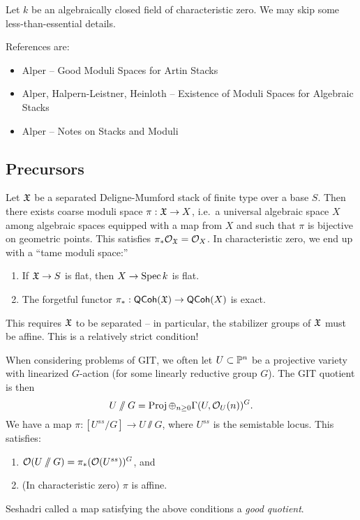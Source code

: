 \documentclass{amsart}
\begin{document}
Let $k$ be an algebraically closed field of characteristic zero.
We may skip some less-than-essential details.

References are:
\begin{itemize}
	\item Alper -- Good Moduli Spaces for Artin Stacks
	\item Alper, Halpern-Leistner, Heinloth -- Existence of Moduli Spaces for Algebraic Stacks
	\item Alper -- Notes on Stacks and Moduli
\end{itemize}

\subsection{Precursors}

\begin{thm}
	Let $\mathfrak{X}$ be a separated Deligne-Mumford stack of finite type over a base $S$.
	Then there exists coarse moduli space $\pi: \mathfrak{X} \to X$, i.e.\ a universal algebraic space $X$ among algebraic spaces equipped with a map from $X$ and such that $\pi$ is bijective on geometric points.
	This satisfies $\pi_* \mathcal{O}_{\mathfrak{X}} = \mathcal{O}_X$.
	In characteristic zero, we end up with a ``tame moduli space:''
	\begin{enumerate}
		\item If $\mathfrak{X} \to S$ is flat, then $X \to \operatorname{Spec} k$ is flat.
		\item The forgetful functor $\pi_*: \mathsf{QCoh}(\mathfrak{X}) \to \mathsf{QCoh}(X)$ is exact.
	\end{enumerate}
\end{thm}

This requires $\mathfrak{X}$ to be separated -- in particular, the stabilizer groups of $\mathfrak{X}$ must be affine.
This is a relatively strict condition!

When considering problems of GIT, we often let $U \subset \mathbb{P}^n$ be a projective variety with linearized $G$-action (for some linearly reductive group $G$).
The GIT quotient is then
\[
	U \mathbin{/\mkern-6mu/} G = \operatorname{Proj} \oplus_{n \geq 0} \Gamma(U, \mathcal{O}_U(n))^G.
\]
We have a map $\pi: [U^{ss} / G] \to U \sslash G$, where $U^{ss}$ is the semistable locus.
This satisfies:
\begin{enumerate}
	\item $\mathcal{O}(U \mathbin{/\mkern-6mu/} G) = \pi_*(\mathcal{O}(U^{ss}))^G$, and
	\item (In characteristic zero) $\pi$ is affine.
\end{enumerate}
Seshadri called a map satisfying the above conditions a \emph{good quotient}.
\end{document}
